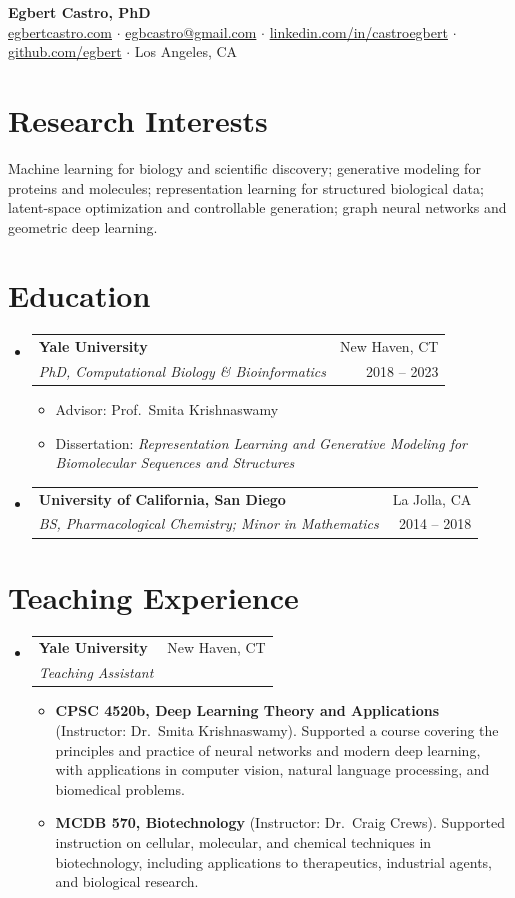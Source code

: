 \documentclass[letterpaper,11pt]{article}
\makeatletter
\newcommand{\resumeSubheading}[4]{
  \vspace{-1pt}\item
    \begin{tabular*}{\textwidth}[t]{l@{\extracolsep{\fill}}r}
      \textbf{#1} & {\small #2}\vspace{1pt}\\
      \textit{#3} & {\small #4}\\
    \end{tabular*}\vspace{-4pt}
}
\newcommand{\resumeSubHeadingListStart}{\begin{itemize}[leftmargin=0in, label={}, itemsep=6pt, topsep=3pt]}
\newcommand{\resumeSubHeadingListEnd}{\end{itemize}}
\newcommand{\resumeItemListStart}{\begin{itemize}[leftmargin=0.18in, itemsep=2pt, topsep=2pt]}
\newcommand{\resumeItemListEnd}{\end{itemize}\vspace{-2pt}}
\newcommand{\resumeItem}[1]{\item\small{{#1 \vspace{-1pt}}}}
\makeatother
\begin{document}
\begin{center}
    {\LARGE \textbf{Egbert Castro, PhD}} \\ \vspace{6pt}
    \small
    \href{https://egbertcastro.com}{egbertcastro.com}
    \hspace{5pt}$\cdot$\hspace{5pt}
    \href{mailto:egbcastro@gmail.com}{egbcastro@gmail.com}
    \hspace{5pt}$\cdot$\hspace{5pt}
    \href{https://www.linkedin.com/in/castroegbert}{linkedin.com/in/castroegbert}
    \hspace{5pt}$\cdot$\hspace{5pt}
    \href{https://github.com/egbert}{github.com/egbert}
    \hspace{5pt}$\cdot$\hspace{5pt}
    Los Angeles, CA
\end{center}

\section{Research Interests}
{\small
Machine learning for biology and scientific discovery; generative modeling for proteins and molecules; representation learning for structured biological data; latent-space optimization and controllable generation; graph neural networks and geometric deep learning.
}

\section{Education}
\resumeSubHeadingListStart
  \resumeSubheading
    {Yale University}{New Haven, CT}
    {PhD, Computational Biology \& Bioinformatics}{2018 -- 2023}
    \resumeItemListStart
      \resumeItem{Advisor: Prof.\ Smita Krishnaswamy}
      \resumeItem{Dissertation: \textit{Representation Learning and Generative Modeling for Biomolecular Sequences and Structures}}
    \resumeItemListEnd

  \resumeSubheading
    {University of California, San Diego}{La Jolla, CA}
    {BS, Pharmacological Chemistry; Minor in Mathematics}{2014 -- 2018}
\resumeSubHeadingListEnd

\section{Teaching Experience}
\resumeSubHeadingListStart
  \resumeSubheading
    {Yale University}{New Haven, CT}
    {Teaching Assistant}{}
    \resumeItemListStart
      \resumeItem{\textbf{CPSC 4520b, Deep Learning Theory and Applications} (Instructor: Dr.\ Smita Krishnaswamy). Supported a course covering the principles and practice of neural networks and modern deep learning, with applications in computer vision, natural language processing, and biomedical problems.}
      \resumeItem{\textbf{MCDB 570, Biotechnology} (Instructor: Dr.\ Craig Crews). Supported instruction on cellular, molecular, and chemical techniques in biotechnology, including applications to therapeutics, industrial agents, and biological research.}
    \resumeItemListEnd
\resumeSubHeadingListEnd
\end{document}
